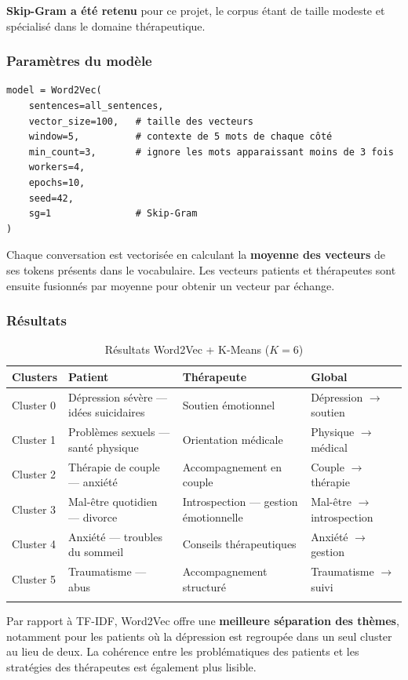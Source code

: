 \documentclass[12pt,a4paper]{article}
\begin{document}
\textbf{Skip-Gram a été retenu} pour ce projet, le corpus étant de taille modeste et
spécialisé dans le domaine thérapeutique.

\subsubsection{Paramètres du modèle}

\begin{lstlisting}
model = Word2Vec(
    sentences=all_sentences,
    vector_size=100,   # taille des vecteurs
    window=5,          # contexte de 5 mots de chaque côté
    min_count=3,       # ignore les mots apparaissant moins de 3 fois
    workers=4,
    epochs=10,
    seed=42,
    sg=1               # Skip-Gram
)
\end{lstlisting}

Chaque conversation est vectorisée en calculant la \textbf{moyenne des vecteurs} de ses
tokens présents dans le vocabulaire. Les vecteurs patients et thérapeutes sont ensuite
fusionnés par moyenne pour obtenir un vecteur par échange.

\subsubsection{Résultats}

\begin{longtable}{p{2.2cm}|p{3.8cm}|p{3.8cm}|p{4cm}}
\toprule
\textbf{Clusters} & \textbf{Patient} & \textbf{Thérapeute} & \textbf{Global} \\
\midrule
\endhead
Cluster 0 & Dépression sévère — idées suicidaires & Soutien émotionnel & Dépression $\to$ soutien \\
Cluster 1 & Problèmes sexuels — santé physique & Orientation médicale & Physique $\to$ médical \\
Cluster 2 & Thérapie de couple — anxiété & Accompagnement en couple & Couple $\to$ thérapie \\
Cluster 3 & Mal-être quotidien — divorce & Introspection — gestion émotionnelle & Mal-être $\to$ introspection \\
Cluster 4 & Anxiété — troubles du sommeil & Conseils thérapeutiques & Anxiété $\to$ gestion \\
Cluster 5 & Traumatisme — abus & Accompagnement structuré & Traumatisme $\to$ suivi \\
\bottomrule
\caption{Résultats Word2Vec + K-Means ($K=6$)}
\end{longtable}

Par rapport à TF-IDF, Word2Vec offre une \textbf{meilleure séparation des thèmes}, notamment
pour les patients où la dépression est regroupée dans un seul cluster au lieu de deux. La
cohérence entre les problématiques des patients et les stratégies des thérapeutes est également
plus lisible.
\end{document}
